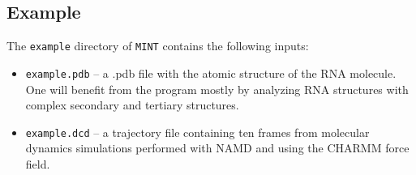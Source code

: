 \documentclass[12pt]{article}
\begin{document}
\subsection{Example} \label{Example_sec}
The {\tt example} directory of {\tt MINT} contains the following inputs:
\begin{itemize}
\item {\tt example.pdb}  -- a .pdb file with the atomic structure of the RNA molecule. One will benefit from the program mostly by analyzing RNA structures with complex secondary and tertiary structures.
\item {\tt example.dcd}  -- a trajectory file containing ten frames from molecular dynamics simulations performed with NAMD \cite{Phillips2005} and using the CHARMM force field.
\end{itemize}
\end{document}

